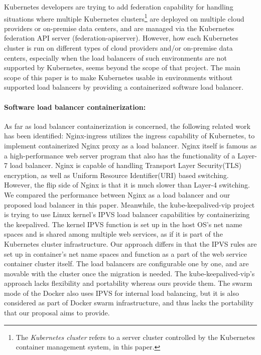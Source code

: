 Kubernetes developers are trying to add federation\cite{K8sFederation2017} capability for handling situations 
where multiple Kubernetes clusters\footnote{The {\em Kubernetes cluster} refers to a server cluster 
controlled by the Kubernetes container management system, in this paper.} 
are deployed on multiple cloud providers or on-premise data centers, 
and are managed via the Kubernetes federation API server (federation-apiserver). 
However, how each Kubernetes cluster is run on different types of cloud providers
and/or on-premise data centers, especially when the load balancers of such environments are not supported by Kubernetes, 
seems beyond the scope of that project. 
The main scope of this paper is to make Kubernetes usable in environments 
without supported load balancers by providing a containerized software load balancer.

\paragraph{\bf Software load balancer containerization:}
As far as load balancer containerization is concerned, the following related work has been identified:
Nginx-ingress\cite{Pleshakov2016,NginxInc2016} utilizes the ingress\cite{K8sIngress2017} capability of Kubernetes, 
to implement containerized Nginx proxy as a load balancer. Nginx itself is famous as a high-performance web server program
that also has the functionality of a Layer-7 load balancer. Nginx is capable of handling Transport Layer Security(TLS) encryption, 
as well as Uniform Resource Identifier(URI) based switching. However, the flip side of Nginx is that it is much slower than Layer-4 switching.
We compared the performance between Nginx as a load balancer and our proposed load balancer in this paper.
%
Meanwhile, the kube-keepalived-vip\cite{Prashanth2016} project is trying to use Linux kernel's IPVS\cite{Zhang2000} 
load balancer capabilities by containerizing the keepalived\cite{ACassen2016}.
The kernel IPVS function is set up in the host OS's net name spaces and is shared among multiple web services,
as if it is part of the Kubernetes cluster infrastructure.
Our approach differs in that the IPVS rules are set up in container's net name spaces 
and function as a part of the web service container cluster itself.
The load balancers are configurable one by one, and are  movable with the cluster once the migration is needed.
The kube-keepalived-vip's approach lacks flexibility and portability whereas ours provide them.
%
The swarm mode of the Docker\cite{DockerCoreEngineering2016,DockerInc2017} also uses IPVS for internal load balancing,
but it is also considered as part of Docker swarm infrastructure, 
and thus lacks the portability that our proposal aims to provide.

